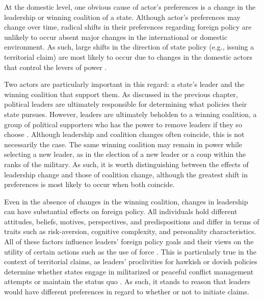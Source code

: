 
At the domestic level, one obvious cause of actor’s preferences is a change in the leadership or winning coalition of a state. Although actor’s preferences may change over time, radical shifts in their preferences regarding foreign policy are unlikely to occur absent major changes in the international or domestic environment. As such, large shifts in the direction of state policy (e.g., issuing a territorial claim) are most likely to occur due to changes in the domestic actors that control the levers of power \citep{cox1982, mattes2015}.

Two actors are particularly important in this regard: a state’s leader and the winning coalition that support them. As discussed in the previous chapter, political leaders are ultimately responsible for determining what policies their state pursues. However, leaders are ultimately beholden to a winning coalition, a group of political supporters who has the power to remove leaders if they so choose \citep{bdm2003}. Although leadership and coalition changes often coincide, this is not necessarily the case. The same winning coalition may remain in power while selecting a new leader, as in the election of a new leader or a coup within the ranks of the military. As such, it is worth distinguishing between the effects of leadership change and those of coalition change, although the greatest shift in preferences is most likely to occur when both coincide.


Even in the absence of changes in the winning coalition, changes in leadership can have substantial effects on foreign policy. All individuals hold different attitudes, beliefs, motives, perspectives, and predispositions and differ in terms of traits such as risk-aversion, cognitive complexity, and personality characteristics. All of these factors influence leaders’ foreign policy goals and their views on the utility of certain actions such as the use of force \citep[see, e.g.,][]{etheredge1978, guetzkow1981, haas1974, hermann1974, hoffmann1970, kahneman1979, wittkopf1983}. This is particularly true in the context of territorial claims, as leaders’ proclivities for hawkish or dovish policies determine whether states engage in militarized or peaceful conflict management attempts or maintain the status quo \citep[e.g.,][]{chiozza2003, colaresi2004, colaresi2005, vasquez2009}. As such, it stands to reason that leaders would have different preferences in regard to whether or not to initiate claims. 

